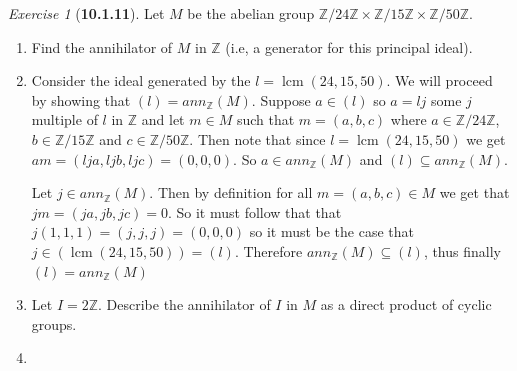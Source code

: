 \documentclass[12pt]{amsart}
\makeatletter
\theoremstyle{remark}
\newtheorem*{exercise}{Exercise}%
\def\ZZ{\ensuremath{\mathbb Z}}
\renewenvironment{proof}[1][\proofname]{\par\doublespacing
  \pushQED{\qed}%
  \normalfont \topsep6\p@\@plus6\p@\relax
  \list{}{%
    \settowidth{\leftmargin}{\itshape\proofname:\hskip\labelsep}%
    \setlength{\labelwidth}{0pt}%
    \setlength{\itemindent}{-\leftmargin}%
  }%
  \item[\hskip\labelsep\itshape#1\@addpunct{:}]\ignorespaces
}{%
  \popQED\endlist\@endpefalse
  \singlespacing
}
\theoremstyle{mycomment}
\DeclareMathOperator{\lcm}{lcm}
\makeatother
\begin{document}
\begin{exercise}[\textbf{10.1.11}] Let $M$ be the abelian group $\ZZ/24\ZZ \times \ZZ/15\ZZ \times \ZZ/50\ZZ$.
  \begin{enumerate}
    \item[(a)] Find the annihilator of $M$ in $\ZZ$ (i.e, a generator for this principal ideal).
    \begin{proof} Consider the ideal generated by the $l = \lcm(24, 15, 50)$. We will proceed by showing that $(l) = ann_{\ZZ}(M)$.
      Suppose $a \in (l)$ so $a = lj$ some $j$ multiple of $l$ in $\ZZ$
      and let $m \in M$ such that $m = (a, b, c)$ where $a \in \ZZ/24\ZZ$, $b \in \ZZ/15\ZZ$ and $c \in \ZZ/50\ZZ$. 
      Then note that since $l = \lcm(24, 15, 50)$ we get $am = (lja, ljb, ljc) = (0, 0, 0)$. So $a \in ann_{\ZZ}(M)$ and $(l)\subseteq ann_{\ZZ}(M)$. 
      
      Let $j \in ann_{\ZZ}(M)$. Then by definition for all $m = (a, b, c) \in M$ we get that $jm = (ja, jb, jc) = 0$. So it must follow that
      that $j(1, 1, 1) = (j, j, j) = (0, 0, 0)$ so it must be the case that $j \in (\lcm(24, 15, 50)) = (l)$. Therefore
      $ann_{\ZZ}(M) \subseteq (l)$, thus finally $(l) = ann_{\ZZ}(M)$
    \end{proof}
\vspace{.15in}


    \item[(b)] Let $I = 2\ZZ$. Describe the annihilator of $I$ in $M$ as a direct product of cyclic groups. 
   \begin{proof}

    \end{proof}
\vspace{.15in}
  \end{enumerate}

\end{exercise}
\vspace{.5in}
\end{document}
